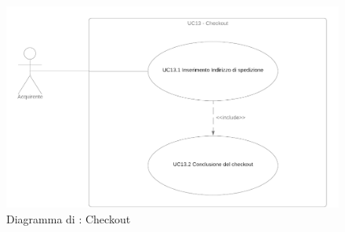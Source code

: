 
\label{checkout}

\begin{figure}[H]
    \centering
    \includegraphics[scale=0.4]{Immagini/DiagrammiUC/UC13Checkout.png}
    \caption{Diagramma di \actualUC: Checkout} 
    \label{fig:Checkout}
\end{figure}

